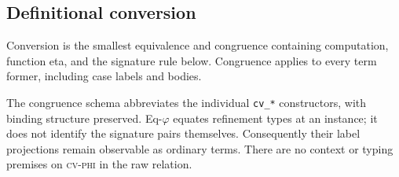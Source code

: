 \subsection{Definitional conversion}
Conversion is the smallest equivalence and congruence containing computation, function eta, and the signature rule below. Congruence applies to every term former, including case labels and bodies.
The congruence schema abbreviates the individual \texttt{cv\_*} constructors, with binding structure preserved. Eq-$\varphi$ equates refinement types at an instance; it does not identify the signature pairs themselves. Consequently their label projections remain observable as ordinary terms. There are no context or typing premises on \textsc{cv-phi} in the raw relation.
